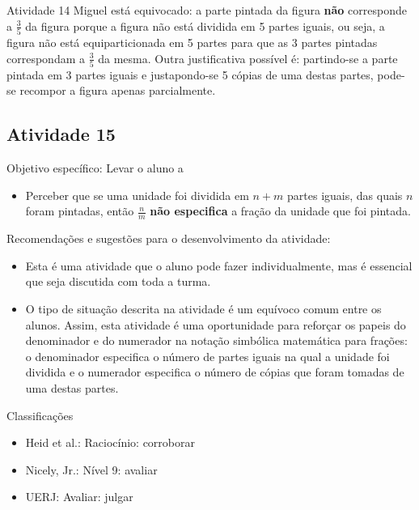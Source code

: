 \documentclass[oneside]{book}
\begin{document}
\begin{multicols}{2}
\begin{resposta*}{Atividade 14}
  Miguel está equivocado: a parte pintada da figura   {\bf não}   corresponde a   $\frac{3}{5}$   da figura porque a figura não está dividida em 5 partes iguais, ou seja, a figura não está equiparticionada em 5 partes para que as 3 partes pintadas correspondam a   $\frac{3}{5}$   da mesma. Outra justificativa possível é: partindo-se a parte pintada em 3 partes iguais e justapondo-se 5 cópias de uma destas partes, pode-se recompor a figura apenas parcialmente.

\end{resposta*}



\subsection{Atividade 15}



  Objetivo específico: Levar o aluno a
\begin{itemize} %
    \item       Perceber que se uma unidade foi dividida em       $n + m$       partes iguais, das quais       $n$       foram pintadas, então       $\frac{n}{m}$             {\bf não especifica}       a fração da unidade que foi pintada.
\end{itemize} %


  Recomendações e sugestões para o desenvolvimento da atividade:
\begin{itemize} %
    \item       Esta é uma atividade que o aluno pode fazer individualmente, mas é essencial que seja discutida com toda a turma.
    \item       O tipo de situação descrita na atividade é um equívoco comum entre os alunos. Assim, esta atividade é uma oportunidade para reforçar os papeis do denominador e do numerador na notação simbólica matemática para frações: o denominador especifica o número de partes iguais na qual a unidade foi dividida e o numerador especifica o número de cópias que foram tomadas de uma destas partes.
\end{itemize} %


  Classificações
\begin{itemize} %
    \item       Heid et al.: Raciocínio: corroborar
    \item       Nicely, Jr.: Nível 9: avaliar
    \item       UERJ: Avaliar: julgar
\end{itemize} %



\end{multicols}
\end{document}

